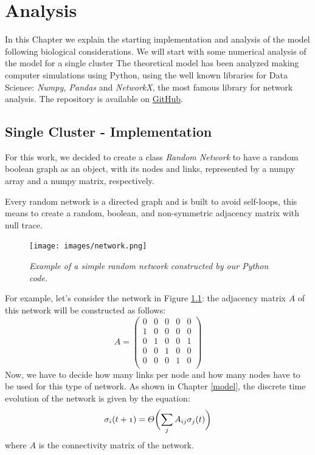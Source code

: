 \chapter{Analysis}\label{analysis}
\lhead[\fancyplain{}{\bfseries\thepage}]{\fancyplain{}{\bfseries\rightmark}}

In this Chapter we explain the starting implementation and analysis of the model following biological considerations.
We will start with some numerical analysis of the model for a single cluster
The theoretical model has been analyzed making computer simulations using Python, using the well known libraries for Data Science: \emph{Numpy, Pandas} and  \emph{NetworkX}, the most famous library for network analysis. The repository is available on \href{https://github.com/riccardoscheda/thesis}{GitHub}.

\section{Single Cluster - Implementation}

For this work, we decided to create a class \emph{Random Network} to have a random boolean graph as an object, with its nodes and links, represented by a numpy array and a numpy matrix, respectively.

Every random network is a directed graph and is built to avoid self-loops, this means to create a random, boolean, and non-symmetric adjacency matrix with null trace.
\begin{figure}
\centering
\texttt{[image: images/network.png]}
\caption{\emph{Example of a simple random network constructed by our Python code.}}
\label{fig:ne}
\end{figure}

For example, let's consider the network in Figure \ref{fig:ne}: the adjacency matrix $A$ of this network will be constructed as follows:
$$
A = \left (
\begin{array}{ccccc}

0 & 0 & 0 & 0 & 0  \\
1 & 0 & 0 & 0 & 0  \\
0 & 1 & 0 & 0 & 1  \\
0 & 0 & 1 & 0 & 0  \\
0 & 0 & 0 & 1 & 0  \\

\end{array}
\right )
$$
Now, we have to decide how many links per node and how many nodes have to be used for this type of network. 
As shown in Chapter \ref{model}, the discrete time evolution of the network is given by the equation:
$$
\mathnormal{\sigma_i(t+1)=\Theta\biggl(\sum_jA_{ij}\sigma_j(t)\biggr)}
$$
where $A$ is the connectivity matrix of the network.


